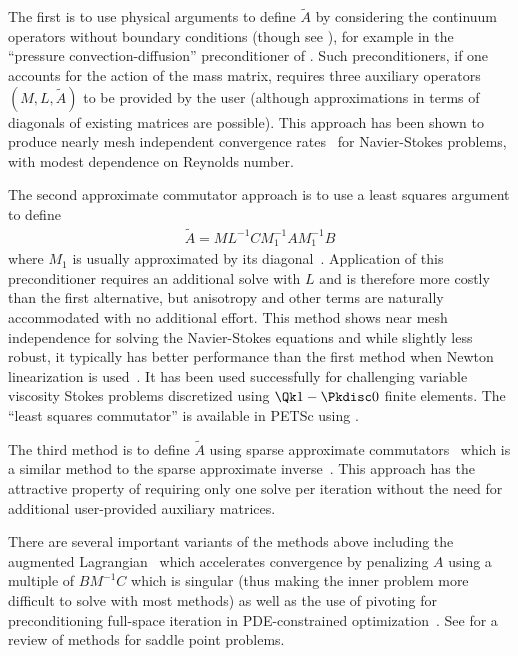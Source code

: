 The first is to use physical arguments to define $\tilde A$ by considering the continuum operators without boundary conditions (though see \cite{elman2009boundary}), for example in the ``pressure convection-diffusion'' preconditioner of \cite{silvester2001efficient,kay2002pss}.
Such preconditioners, if one accounts for the action of the mass matrix, requires three auxiliary operators $(M,L,\tilde A)$ to be provided by the user (although approximations in terms of diagonals of existing matrices are possible).
This approach has been shown to produce nearly mesh independent convergence rates~\cite{elman2005psm,deniet2007tps,elman2008tcp} for Navier-Stokes problems, with modest dependence on Reynolds number.

The second approximate commutator approach is to use a least squares argument to define
\begin{align*}
  \tilde A = M L^{-1} C M_1^{-1} A M_1^{-1} B
\end{align*}
where $M_1$ is usually approximated by its diagonal~\cite{elman1999bfbt,elman2006bpb}.
Application of this preconditioner requires an additional solve with $L$ and is therefore more costly than the first alternative, but anisotropy and other terms are naturally accommodated with no additional effort.
This method shows near mesh independence for solving the Navier-Stokes equations and while slightly less robust, it typically has better performance than the first method when Newton linearization is used~\cite{elman2008tcp}.
It has been used successfully for challenging variable viscosity Stokes problems discretized using $\Qk 1-\Pkdisc 0$ finite elements.
The ``least squares commutator'' is available in PETSc using .

The third method is to define $\tilde A$ using sparse approximate commutators~\cite{elman2006bpb} which is a similar method to the sparse approximate inverse~\cite{grote1997parallel}.
This approach has the attractive property of requiring only one solve per iteration without the need for additional user-provided auxiliary matrices.

There are several important variants of the methods above including the augmented Lagrangian~\cite{awanou2005convergence,dohrmann2006pbp,deniet2007tps} which accelerates convergence by penalizing $A$ using a multiple of $B M^{-1} C$ which is singular (thus making the inner problem more difficult to solve with most methods) as well as the use of pivoting for preconditioning full-space iteration in PDE-constrained optimization~\cite{biros2005pln1,biros2005pln2,akcelik2006pap}.
See \cite{benzi2005nss} for a review of methods for saddle point problems.

